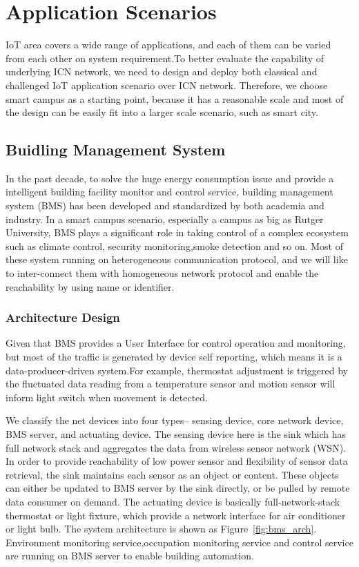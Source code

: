 \section{Application Scenarios}
IoT area covers a wide range of applications, and each of them can be varied from each other on system requirement.To better evaluate the capability of underlying ICN network, we need to design and deploy both classical and challenged IoT application scenario over ICN network. Therefore, we choose smart campus as a starting point, because it has a reasonable scale and most of the design can be easily fit into a larger scale scenario, such as smart city.
\subsection{Buidling Management System}
In the past decade, to solve the huge energy consumption issue and provide a intelligent building facility monitor and control service, building management system (BMS) has been developed and standardized  by both academia and industry. In a smart campus scenario, especially a campus as big as Rutger  University, BMS plays a significant role in taking control of a complex ecosystem such as climate control, security monitoring,smoke detection and so on. Most of these system running on heterogeneous communication protocol, and we will like to inter-connect them with homogeneous network protocol and enable the reachability by using name or identifier. 
\subsubsection{Architecture Design}
Given that BMS provides a User Interface for control operation and monitoring, but most of the traffic is generated by device self reporting, which means it is a data-producer-driven system.For example, thermostat adjustment is triggered by the fluctuated data reading from a temperature sensor and motion sensor will inform light switch when movement is detected. 

We classify the net devices into four types-- sensing device, core network device, BMS server, and actuating device. The sensing device here is the sink which has full network stack  and aggregates the data from wireless sensor network (WSN). In order to provide reachability of low power sensor and flexibility of sensor data retrieval, the sink maintains each sensor as an object or content. These objects can either be updated to BMS server by the sink directly, or be pulled by remote data consumer on demand. The actuating device is basically full-network-stack thermostat or light fixture, which provide a network interface for air conditioner or light bulb. The system architecture is shown as Figure~\ref{fig:bms_arch}. Environment monitoring service,occupation monitoring service and control service are running on BMS server to enable building automation. 

